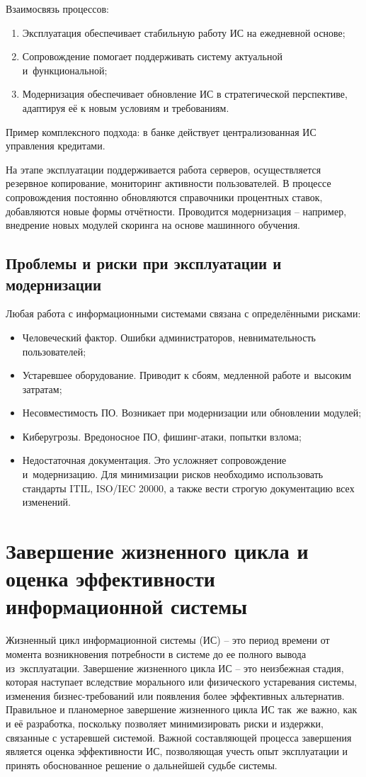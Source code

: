 \documentclass{ou}
\begin{document}
Взаимосвязь процессов:
\begin{enumerate}[leftmargin=0em, itemindent=3.75em, nosep, label=\arabic*)]
\item Эксплуатация обеспечивает стабильную работу ИС на ежедневной основе;
\item Сопровождение помогает поддерживать систему актуальной и~функциональной;
\item Модернизация обеспечивает обновление ИС в стратегической перспективе, адаптируя её к новым условиям и требованиям.
\end{enumerate}

Пример комплексного подхода: в банке действует централизованная ИС управления кредитами.

На этапе эксплуатации поддерживается работа серверов, осуществляется резервное копирование, мониторинг активности пользователей. В процессе сопровождения постоянно обновляются справочники процентных ставок, добавляются новые формы отчётности. Проводится модернизация -- например, внедрение новых модулей скоринга на основе машинного обучения.
\subsection{Проблемы и риски при эксплуатации и модернизации}
Любая работа с информационными системами связана с определёнными рисками:
\begin{itemize}[label=-, leftmargin=0em, itemindent=3.35em, nosep]
\item Человеческий фактор. Ошибки администраторов, невнимательность пользователей;
\item Устаревшее оборудование. Приводит к сбоям, медленной работе и~высоким затратам;
\item Несовместимость ПО. Возникает при модернизации или обновлении модулей;
\item Киберугрозы. Вредоносное ПО, фишинг-атаки, попытки взлома;
\item Недостаточная документация. Это усложняет сопровождение и~модернизацию. Для минимизации рисков необходимо использовать стандарты ITIL, ISO/IEC 20000, а также вести строгую документацию всех изменений.
\end{itemize}
\newpage
\section{Завершение жизненного цикла и оценка эффективности информационной системы}
Жизненный цикл информационной системы (ИС) -- это период времени от момента возникновения потребности в системе до ее полного вывода из~эксплуатации. Завершение жизненного цикла ИС -- это неизбежная стадия, которая наступает вследствие морального или физического устаревания системы, изменения бизнес-требований или появления более эффективных альтернатив. Правильное и планомерное завершение жизненного цикла ИС так~же важно, как и её разработка, поскольку позволяет минимизировать риски и издержки, связанные с устаревшей системой. Важной составляющей процесса завершения является оценка эффективности ИС, позволяющая учесть опыт эксплуатации и принять обоснованное решение о дальнейшей судьбе системы.
\end{document}
